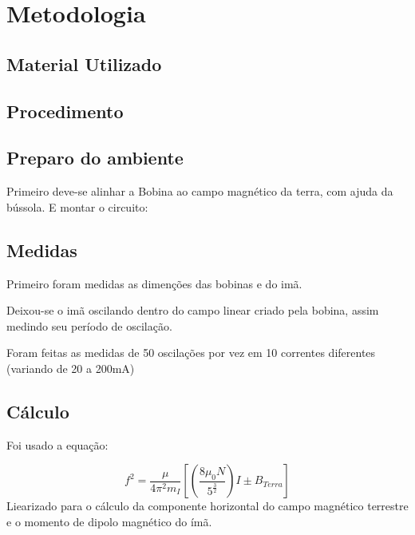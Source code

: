 \section{Metodologia}
    \subsection{Material Utilizado}
        
    \subsection{Procedimento}
        \subsection{Preparo do ambiente}
            Primeiro deve-se alinhar a Bobina ao campo magnético da terra,
            com ajuda da bússola.
            E montar o circuito:
            
        \subsection{Medidas}
            Primeiro foram medidas as dimenções das bobinas e do imã.
            
            Deixou-se o imã oscilando dentro do campo linear criado
            pela bobina, assim medindo seu período de oscilação.

            Foram feitas as medidas de 50 oscilações por vez em 10
            correntes diferentes (variando de 20 a 200mA)
        \subsection{Cálculo}
            Foi usado a equação:

            $$f^2 = \frac{\mu}{4 \pi^2 m_I} 
            [(\frac{8\mu_0 N}{5^{\frac{3}{2}}}) I \pm B_{Terra}]$$
            Liearizado para o cálculo da componente 
            horizontal do campo magnético terrestre 
            e o momento de dipolo magnético do ímã.